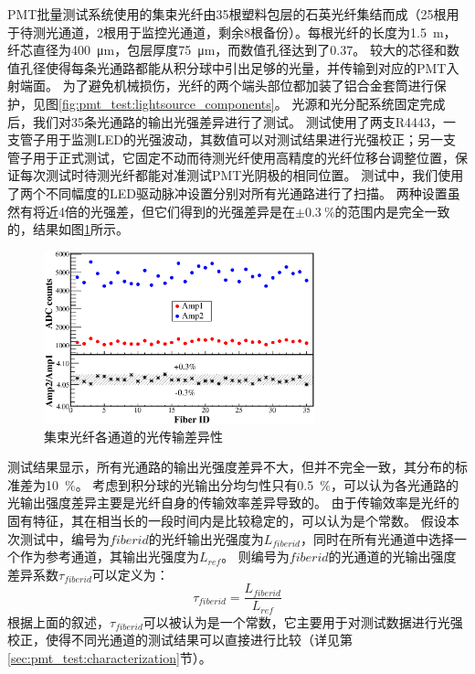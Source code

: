 PMT批量测试系统使用的集束光纤由35根塑料包层的石英光纤\parencite{optical_fibre}集结而成（25根用于待测光通道，2根用于监控光通道，剩余8根备份）。每根光纤的长度为\SI{1.5}{\meter}，纤芯直径为\SI{400}{\micro\meter}，包层厚度\SI{75}{\micro\meter}，而数值孔径达到了$0.37$。
较大的芯径和数值孔径使得每条光通路都能从积分球中引出足够的光量，并传输到对应的PMT入射端面。
为了避免机械损伤，光纤的两个端头部位都加装了铝合金套筒进行保护，见图\ref{fig:pmt_test:lightsource_components}。
光源和光分配系统固定完成后，我们对35条光通路的输出光强差异进行了测试。
测试使用了两支R4443，一支管子用于监测LED的光强波动，其数值可以对测试结果进行光强校正；另一支管子用于正式测试，它固定不动而待测光纤使用高精度的光纤位移台调整位置，保证每次测试时待测光纤都能对准测试PMT光阴极的相同位置。
测试中，我们使用了两个不同幅度的LED驱动脉冲设置分别对所有光通路进行了扫描。
两种设置虽然有将近4倍的光强差，但它们得到的光强差异是在$\pm \SI{0.3}{\percent}$的范围内是完全一致的，结果如图\ref{fig:pmt_test:fiber_difference}所示。
\begin{figure}[htbp]
	\centering
	\includegraphics[width=0.7\textwidth]{chap/pmt_test/fig/fiber_difference.eps}
	\caption{集束光纤各通道的光传输差异性}
	\label{fig:pmt_test:fiber_difference}
\end{figure}
测试结果显示，所有光通路的输出光强度差异不大，但并不完全一致，其分布的标准差为\SI{10}{\percent}。
考虑到积分球的光输出分均匀性只有\SI{0.5}{\percent}，可以认为各光通路的光输出强度差异主要是光纤自身的传输效率差异导致的。
由于传输效率是光纤的固有特征，其在相当长的一段时间内是比较稳定的，可以认为是个常数。
假设本次测试中，编号为$fiberid$的光纤输出光强度为$L_{fiberid}$，同时在所有光通道中选择一个作为参考通道，其输出光强度为$L_{ref}$。
则编号为$fiberid$的光通道的光输出强度差异系数$\tau_{fiberid}$可以定义为：
\begin{equation}
	\tau_{fiberid} = \frac{L_{fiberid}}{L_{ref}}
	\label{eq:pmt_test:lightoutput_difference}
\end{equation}
根据上面的叙述，$\tau_{fiberid}$可以被认为是一个常数，它主要用于对测试数据进行光强校正，使得不同光通道的测试结果可以直接进行比较（详见第\ref{sec:pmt_test:characterization}节）。

